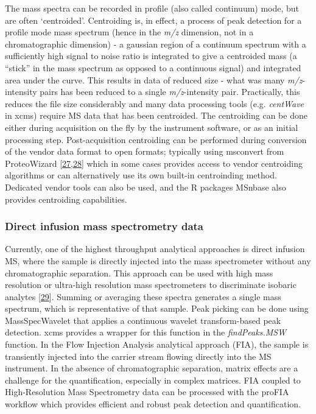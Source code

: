 \documentclass[]{article}
\begin{document}
The mass spectra can be recorded in profile (also called continuum) mode, but are often `centroided'. Centroiding is, in effect, a process of peak detection for a profile mode mass spectrum (hence in the \emph{m/z} dimension, not in a chromatographic dimension) - a gaussian region of a continuum spectrum with a sufficiently high signal to noise ratio is integrated to give a centroided mass (a ``stick'' in the mass spectrum as opposed to a continuous signal) and integrated area under the curve. This results in data of reduced size - what was many \emph{m/z}-intensity pairs has been reduced to a single \emph{m/z}-intensity pair. Practically, this reduces the file size considerably and many data processing tools (e.g. \emph{centWave} in xcms) require MS data that has been centroided. The centroiding can be done either during acquisition on the fly by the instrument software, or as an initial processing step. Post-acquisition centroiding can be performed during conversion of the vendor data format to open formats; typically using msconvert from ProteoWizard {[}\protect\hyperlink{ref-chambers_2012}{27},\protect\hyperlink{ref-kessner_2008}{28}{]} which in some cases provides access to vendor centroiding algorithms or can alternatively use its own built-in centroinding method. Dedicated vendor tools can also be used, and the R packages MSnbase also provides centroiding capabilities.

\hypertarget{direct-infusion-mass-spectrometry-data}{%
\subsubsection{Direct infusion mass spectrometry data}\label{direct-infusion-mass-spectrometry-data}}

Currently, one of the highest throughput analytical approaches is direct infusion MS, where the sample is directly injected into the mass spectrometer without any chromatographic separation. This approach can be used with high mass resolution or ultra-high resolution mass spectrometers to discriminate isobaric analytes {[}\protect\hyperlink{ref-fuhrer_2011}{29}{]}. Summing or averaging these spectra generates a single mass spectrum, which is representative of that sample. Peak picking can be done using MassSpecWavelet that applies a continuous wavelet transform-based peak detection. xcms provides a wrapper for this function in the \emph{findPeaks.MSW} function. In the Flow Injection Analysis analytical approach (FIA), the sample is transiently injected into the carrier stream flowing directly into the MS instrument. In the absence of chromatographic separation, matrix effects are a challenge for the quantification, especially in complex matrices. FIA coupled to High-Resolution Mass Spectrometry data can be processed with the proFIA workflow which provides efficient and robust peak detection and quantification.
\end{document}
